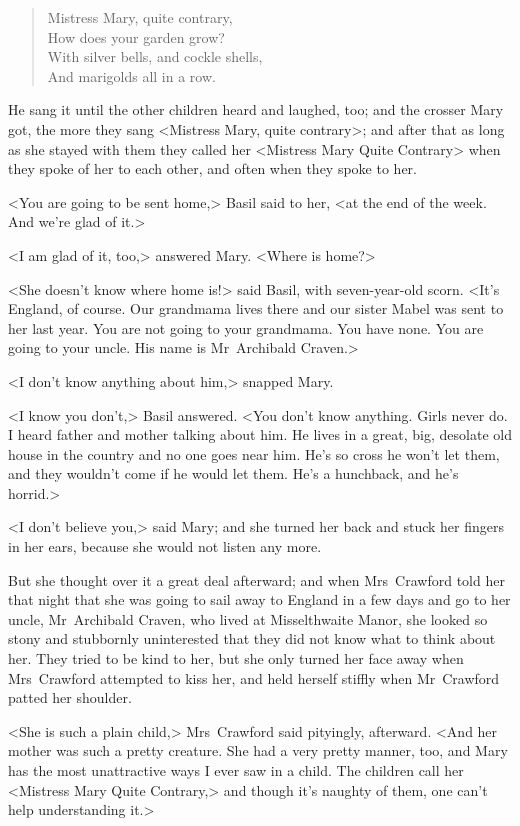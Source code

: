 \begin{verse}
Mistress Mary, quite contrary,\\
How does your garden grow?\\
With silver bells, and cockle shells,\\
And marigolds all in a row.
\end{verse}


He sang it until the other children heard and laughed, too; and the crosser Mary got, the more they sang <Mistress Mary, quite contrary>; and after that as long as she stayed with them they called her <Mistress Mary Quite Contrary> when they spoke of her to each other, and often when they spoke to her.

<You are going to be sent home,> Basil said to her, <at the end of the week. And we're glad of it.>

<I am glad of it, too,> answered Mary. <Where is home?>

<She doesn't know where home is!> said Basil, with seven-year-old scorn. <It's England, of course. Our grandmama lives there and our sister Mabel was sent to her last year. You are not going to your grandmama. You have none. You are going to your uncle. His name is Mr~Archibald Craven.>

<I don't know anything about him,> snapped Mary.

<I know you don't,> Basil answered. <You don't know anything. Girls never do. I heard father and mother talking about him. He lives in a great, big, desolate old house in the country and no one goes near him. He's so cross he won't let them, and they wouldn't come if he would let them. He's a hunchback, and he's horrid.>

<I don't believe you,> said Mary; and she turned her back and stuck her fingers in her ears, because she would not listen any more.

But she thought over it a great deal afterward; and when Mrs~Crawford told her that night that she was going to sail away to England in a few days and go to her uncle, Mr~Archibald Craven, who lived at Misselthwaite Manor, she looked so stony and stubbornly uninterested that they did not know what to think about her. They tried to be kind to her, but she only turned her face away when Mrs~Crawford attempted to kiss her, and held herself stiffly when Mr~Crawford patted her shoulder.

<She is such a plain child,> Mrs~Crawford said pityingly, afterward. <And her mother was such a pretty creature. She had a very pretty manner, too, and Mary has the most unattractive ways I ever saw in a child. The children call her <Mistress Mary Quite Contrary,> and though it's naughty of them, one can't help understanding it.>

